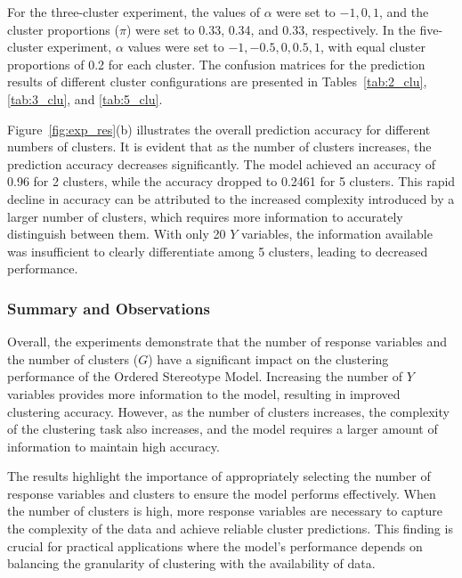\documentclass{article}
\begin{document}
For the three-cluster experiment, the values of \(\alpha\) were set to \(-1, 0, 1\), and the cluster proportions (\(\pi\)) were set to 0.33, 0.34, and 0.33, respectively. 
In the five-cluster experiment, \(\alpha\) values were set to \(-1, -0.5, 0, 0.5, 1\), with equal cluster proportions of 0.2 for each cluster. 
The confusion matrices for the prediction results of different cluster configurations are presented in Tables~\ref{tab:2_clu}, \ref{tab:3_clu}, and \ref{tab:5_clu}.

Figure~\ref{fig:exp_res}(b) illustrates the overall prediction accuracy for different numbers of clusters. 
It is evident that as the number of clusters increases, the prediction accuracy decreases significantly. 
The model achieved an accuracy of 0.96 for 2 clusters, while the accuracy dropped to 0.2461 for 5 clusters. 
This rapid decline in accuracy can be attributed to the increased complexity introduced by a larger number of clusters, which requires more information to accurately distinguish between them. 
With only 20 \( Y \) variables, the information available was insufficient to clearly differentiate among 5 clusters, leading to decreased performance.

\subsubsection*{Summary and Observations}

Overall, the experiments demonstrate that the number of response variables and the number of clusters (\( G \)) have a significant impact on the clustering performance of the Ordered Stereotype Model. 
Increasing the number of \( Y \) variables provides more information to the model, resulting in improved clustering accuracy. 
However, as the number of clusters increases, the complexity of the clustering task also increases, and the model requires a larger amount of information to maintain high accuracy.

The results highlight the importance of appropriately selecting the number of response variables and clusters to ensure the model performs effectively. 
When the number of clusters is high, more response variables are necessary to capture the complexity of the data and achieve reliable cluster predictions. 
This finding is crucial for practical applications where the model's performance depends on balancing the granularity of clustering with the availability of data.
\end{document}
